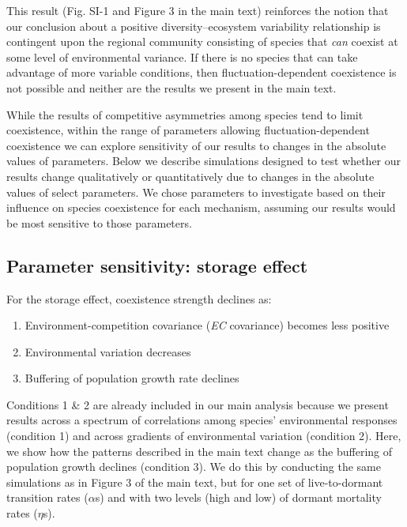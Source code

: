\documentclass[11pt,]{article}
\providecommand{\tightlist}{%
  \setlength{\itemsep}{0pt}\setlength{\parskip}{0pt}}
\begin{document}
This result (Fig. SI-1 and Figure 3 in the main text) reinforces the
notion that our conclusion about a positive diversity--ecosystem
variability relationship is contingent upon the regional community
consisting of species that \emph{can} coexist at some level of
environmental variance. If there is no species that can take advantage
of more variable conditions, then fluctuation-dependent coexistence is
not possible and neither are the results we present in the main text.

While the results of competitive asymmetries among species tend to limit
coexistence, within the range of parameters allowing
fluctuation-dependent coexistence we can explore sensitivity of our
results to changes in the absolute values of parameters. Below we
describe simulations designed to test whether our results change
qualitatively or quantitatively due to changes in the absolute values of
select parameters. We chose parameters to investigate based on their
influence on species coexistence for each mechanism, assuming our
results would be most sensitive to those parameters.

\subsection{Parameter sensitivity: storage effect}

For the storage effect, coexistence strength declines as:

\begin{enumerate}
\def\labelenumi{\arabic{enumi}.}
\tightlist
\item
  Environment-competition covariance (\emph{EC} covariance) becomes less
  positive
\item
  Environmental variation decreases
\item
  Buffering of population growth rate declines
\end{enumerate}

Conditions 1 \& 2 are already included in our main analysis because we
present results across a spectrum of correlations among species'
environmental responses (condition 1) and across gradients of
environmental variation (condition 2). Here, we show how the patterns
described in the main text change as the buffering of population growth
declines (condition 3). We do this by conducting the same simulations as
in Figure 3 of the main text, but for one set of live-to-dormant
transition rates (\(\alpha\)s) and with two levels (high and low) of
dormant mortality rates (\(\eta\)s).
\end{document}
